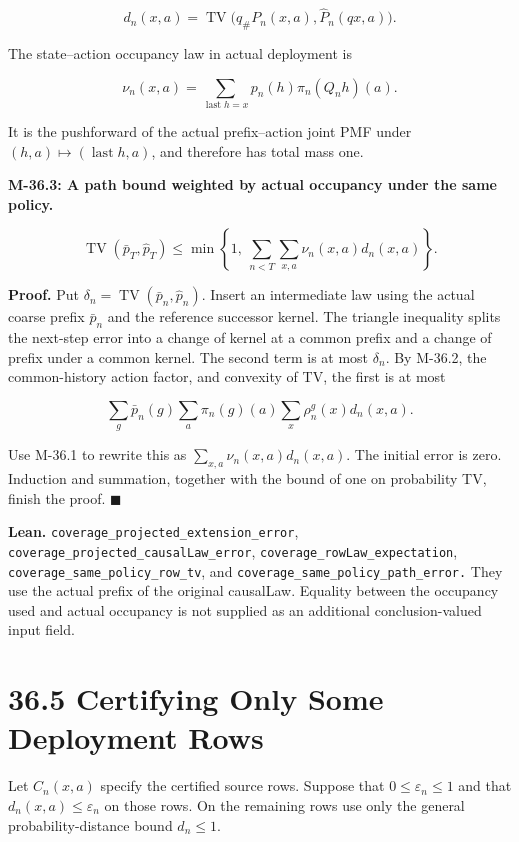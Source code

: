 \documentclass[
  english,
  11pt,
  oneside]{book}
\begin{document}
\[d_n(x,a)=\operatorname{TV}\bigl(q_\#P_n(x,a),\widehat P_n(qx,a)\bigr).\]

The state--action occupancy law in actual deployment is

\[\nu_n(x,a)=
\sum_{\operatorname{last}h=x}p_n(h)\pi_n(Q_nh)(a).\]

It is the pushforward of the actual prefix--action joint PMF under \((h,a)\mapsto(\operatorname{last}h,a)\), and therefore has total mass one.

\hypertarget{m-36-3}{}\label{m-36-3}

\textbf{M-36.3: A path bound weighted by actual occupancy under the same policy.}

\[\operatorname{TV}(\bar p_T,\widehat p_T)
\le
\min\left\{1,\ \sum_{n<T}\sum_{x,a}\nu_n(x,a)d_n(x,a)\right\}.\]

\textbf{Proof.} Put \(\delta_n=\operatorname{TV}(\bar p_n,\widehat p_n)\). Insert an intermediate law using the actual coarse prefix \(\bar p_n\) and the reference successor kernel. The triangle inequality splits the next-step error into a change of kernel at a common prefix and a change of prefix under a common kernel. The second term is at most \(\delta_n\). By M-36.2, the common-history action factor, and convexity of TV, the first is at most

\[\sum_g\bar p_n(g)\sum_a\pi_n(g)(a)\sum_x\rho_n^g(x)d_n(x,a).\]

Use M-36.1 to rewrite this as \(\sum_{x,a}\nu_n(x,a)d_n(x,a)\). The initial error is zero. Induction and summation, together with the bound of one on probability TV, finish the proof. \(\blacksquare\)

\textbf{Lean.} \nolinkurl{coverage_projected_extension_error}, \nolinkurl{coverage_projected_causalLaw_error}, \nolinkurl{coverage_rowLaw_expectation}, \nolinkurl{coverage_same_policy_row_tv}, and \nolinkurl{coverage_same_policy_path_error.} They use the actual prefix of the original causalLaw. Equality between the occupancy used and actual occupancy is not supplied as an additional conclusion-valued input field.

\section{36.5 Certifying Only Some Deployment Rows}\label{certifying-only-some-deployment-rows}

Let \(C_n(x,a)\) specify the certified source rows. Suppose that \(0\le\varepsilon_n\le1\) and that \(d_n(x,a)\le\varepsilon_n\) on those rows. On the remaining rows use only the general probability-distance bound \(d_n\le1\).
\end{document}
